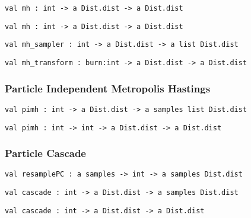 \protect\hyperlink{val-mhux27}{}\texttt{val\ mh\textquotesingle{}\ :\ int\ -\textgreater{}\ \textquotesingle{}a\ Dist.dist\ -\textgreater{}\ \textquotesingle{}a\ Dist.dist}

\protect\hyperlink{val-mhux27ux27}{}\texttt{val\ mh\textquotesingle{}\textquotesingle{}\ :\ int\ -\textgreater{}\ \textquotesingle{}a\ Dist.dist\ -\textgreater{}\ \textquotesingle{}a\ Dist.dist}

\protect\hyperlink{val-mhux5fsampler}{}\texttt{val\ mh\_sampler\ :\ int\ -\textgreater{}\ \textquotesingle{}a\ Dist.dist\ -\textgreater{}\ \textquotesingle{}a\ list\ Dist.dist}

\protect\hyperlink{val-mhux5ftransform}{}\texttt{val\ mh\_transform\ :\ burn:int\ -\textgreater{}\ \textquotesingle{}a\ Dist.dist\ -\textgreater{}\ \textquotesingle{}a\ Dist.dist}

\hypertarget{infux5fpmcmc}{\subsubsection{\texorpdfstring{\protect\hyperlink{infux5fpmcmc}{}Particle
Independent Metropolis
Hastings}{Particle Independent Metropolis Hastings}}\label{infux5fpmcmc}}

\protect\hyperlink{val-pimh}{}\texttt{val\ pimh\ :\ int\ -\textgreater{}\ \textquotesingle{}a\ Dist.dist\ -\textgreater{}\ \textquotesingle{}a\ samples\ list\ Dist.dist}

\protect\hyperlink{val-pimhux27}{}\texttt{val\ pimh\textquotesingle{}\ :\ int\ -\textgreater{}\ int\ -\textgreater{}\ \textquotesingle{}a\ Dist.dist\ -\textgreater{}\ \textquotesingle{}a\ Dist.dist}

\hypertarget{infux5fpc}{\subsubsection{\texorpdfstring{\protect\hyperlink{infux5fpc}{}Particle
Cascade}{Particle Cascade}}\label{infux5fpc}}

\protect\hyperlink{val-resamplePC}{}\texttt{val\ resamplePC\ :\ \textquotesingle{}a\ samples\ -\textgreater{}\ int\ -\textgreater{}\ \textquotesingle{}a\ samples\ Dist.dist}

\protect\hyperlink{val-cascade}{}\texttt{val\ cascade\ :\ int\ -\textgreater{}\ \textquotesingle{}a\ Dist.dist\ -\textgreater{}\ \textquotesingle{}a\ samples\ Dist.dist}

\protect\hyperlink{val-cascadeux27}{}\texttt{val\ cascade\textquotesingle{}\ :\ int\ -\textgreater{}\ \textquotesingle{}a\ Dist.dist\ -\textgreater{}\ \textquotesingle{}a\ Dist.dist}

